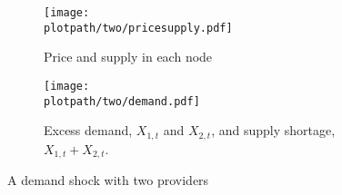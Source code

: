 \begin{figure}[H]
    \begin{subfigure}{0.48\textwidth}
        \centering
        \texttt{[image: \\plotpath/two/pricesupply.pdf]}
        \caption{Price and supply in each node}
    \end{subfigure}
    \hfill
    \begin{subfigure}{0.48\textwidth}
        \centering
        \texttt{[image: \\plotpath/two/demand.pdf]}
        \caption{Excess demand, $X_{1, t}$ and $X_{2, t}$, and supply shortage, $X_{1, t} + X_{2, t}$.}
    \end{subfigure}
    \caption{A demand shock with two providers} \label{fig:two}
\end{figure}

